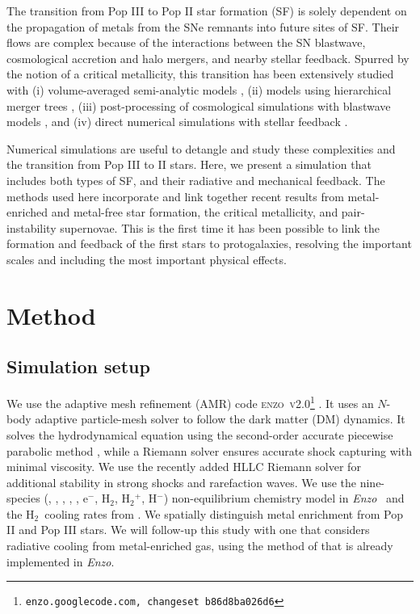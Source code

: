 \documentclass[apjl]{emulateapj}
\newcommand{\enzo}{{\sl Enzo}}
\newcommand{\hh}{H$_2$}
\begin{document}
The transition from Pop III to Pop II star formation (SF) is solely
dependent on the propagation of metals from the SNe remnants into
future sites of SF.  Their flows are complex because of the
interactions between the SN blastwave, cosmological accretion and halo
mergers, and nearby stellar feedback.  Spurred by the notion of a
critical metallicity, this transition has been extensively studied
with (i) volume-averaged semi-analytic models \citep{Scannapieco03,
  Yoshida04, Furlanetto05_Reion}, (ii) models using hierarchical
merger trees \citep{Tumlinson06, Tumlinson10, Salvadori07, Komiya10},
(iii) post-processing of cosmological simulations with blastwave
models \citep{Karlsson08, Trenti09, Trenti10}, and (iv) direct
numerical simulations with stellar feedback \citep{Tornatore07,
  Ricotti08, Maio10_Pop32, Maio10_Enrich}.

Numerical simulations are useful to detangle and study these
complexities and the transition from Pop III to II stars.  Here, we
present a simulation that includes both types of SF, and their
radiative and mechanical feedback.  The methods used here incorporate
and link together recent results from metal-enriched and metal-free
star formation, the critical metallicity, and pair-instability
supernovae.  This is the first time it has been possible to link the
formation and feedback of the first stars to protogalaxies, resolving
the important scales and including the most important physical
effects.

\section{Method}
\label{sec:setup}

\subsection{Simulation setup}

We use the adaptive mesh refinement (AMR) code
\textsc{enzo~v2.0}\footnote{\texttt{enzo.googlecode.com, changeset
    b86d8ba026d6}} \citep{OShea2004}.  It uses an $N$-body adaptive
particle-mesh solver \citep{Efstathiou85} to follow the dark matter
(DM) dynamics.  It solves the hydrodynamical equation using the
second-order accurate piecewise parabolic method \citep{Woodward84,
  Bryan95}, while a Riemann solver ensures accurate shock capturing
with minimal viscosity.  We use the recently added HLLC Riemann solver
\citep{Toro94_HLLC} for additional stability in strong shocks and
rarefaction waves.  We use the nine-species (, ,
, , , e$^-$, \hh, \hh$^+$, H$^-$)
non-equilibrium chemistry model in \enzo~\citep{Abel97, Anninos97} and
the \hh~cooling rates from \citet{Glover08_Rates}.  We spatially
distinguish metal enrichment from Pop II and Pop III stars.  We will
follow-up this study with one that considers radiative cooling from
metal-enriched gas, using the method of \citet{2008MNRAS.385.1443S}
that is already implemented in \enzo.
\end{document}
